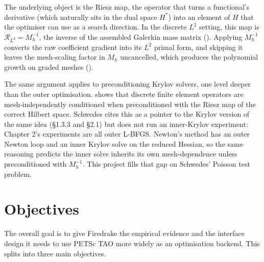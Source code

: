 \documentclass[a4paper,11pt]{article}
\newcommand{\Rmap}{\mathcal{R}}
\begin{document}
The underlying object is the Riesz map, the operator that turns a functional's derivative (which naturally sits in the dual space $H^{*}$) into an element of $H$ that the optimiser can use as a search direction. In the discrete $L^{2}$ setting, this map is $\Rmap_{L^{2}} = M_{h}^{-1}$, the inverse of the assembled Galerkin mass matrix (\citet[Eq.~1.125]{shfp2017}). Applying $M_{h}^{-1}$ converts the raw coefficient gradient into its $L^{2}$ primal form, and skipping it leaves the mesh-scaling factor in $M_{h}$ uncancelled, which produces the polynomial growth on graded meshes (\citet{hinze2009}).

The same argument applies to preconditioning Krylov solvers, one level deeper than the outer optimisation. \citet{kirby2010} shows that discrete finite element operators are mesh-independently conditioned when preconditioned with the Riesz map of the correct Hilbert space. Schwedes cites this as a pointer to the Krylov version of the same idea (\S 1.3.3 and \S 2.1) but does not run an inner-Krylov experiment: Chapter 2's experiments are all outer L-BFGS. Newton's method has an outer Newton loop and an inner Krylov solve on the reduced Hessian, so the same reasoning predicts the inner solve inherits its own mesh-dependence unless preconditioned with $M_{h}^{-1}$. This project fills that gap on Schwedes' Poisson test problem.

\section{Objectives}

The overall goal is to give Firedrake the empirical evidence and the interface design it needs to use PETSc TAO more widely as an optimisation backend. This splits into three main objectives.
\end{document}
